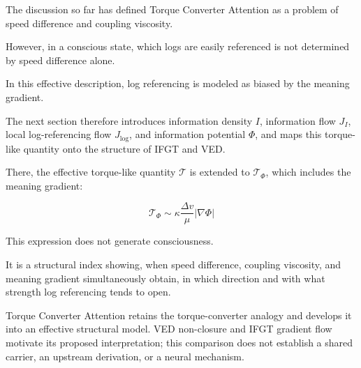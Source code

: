 The discussion so far has defined Torque Converter Attention as a problem of speed difference and coupling viscosity.

However, in a conscious state, which logs are easily referenced is not determined by speed difference alone.

In this effective description, log referencing is modeled as biased by the meaning gradient.

The next section therefore introduces information density $I$, information flow $J_I$, local log-referencing flow $J_{\log}$, and information potential $\Phi$, and maps this torque-like quantity onto the structure of IFGT and VED.

There, the effective torque-like quantity $\mathcal{T}$ is extended to $\mathcal{T}_{\Phi}$, which includes the meaning gradient:

\begin{equation}
\mathcal{T}_{\Phi} \sim \kappa \frac{\Delta v}{\mu} |\nabla \Phi|
\end{equation}

This expression does not generate consciousness.

It is a structural index showing, when speed difference, coupling viscosity, and meaning gradient simultaneously obtain, in which direction and with what strength log referencing tends to open.

Torque Converter Attention retains the torque-converter analogy and develops it into an effective structural model. VED non-closure and IFGT gradient flow motivate its proposed interpretation; this comparison does not establish a shared carrier, an upstream derivation, or a neural mechanism.
